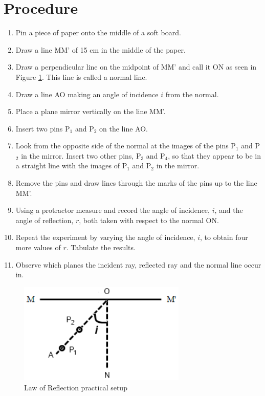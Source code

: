 \section{Procedure}
\begin{enumerate}
\item Pin a piece of paper onto the middle of a soft board.
\item Draw a line MM’ of 15 cm in the middle of the paper.  
\item Draw a perpendicular line on the midpoint of MM’ and call it ON as seen in Figure \ref{fig:law-of-reflection-1}. This line is called a normal line.
\item Draw a line AO making an angle of incidence $i$ from the normal.  
\item Place a plane mirror vertically on the line MM’.
\item Insert two pins P$_1$ and P$_2$ on the line AO.
\item Look from the opposite side of the normal at the images of the pins P$_1$ and P$_2$ in the mirror. Insert two other pins, P$_3$ and P$_4$, so that they appear to be in a straight line with the images of P$_1$ and P$_2$ in the mirror.
\item Remove the pins and draw lines through the marks of the pins up to the line MM’.
\item Using a protractor measure and record the angle of incidence, $i$, and the angle of reflection, $r$, both taken with respect to the normal ON. 
\item Repeat the experiment by varying the angle of incidence, $i$, to obtain four more values of $r$. Tabulate the results.
\item Observe which planes the incident ray, reflected ray and the normal line occur in. 
\end{enumerate}

\begin{figure}[h!]
\centering
\includegraphics[width=8cm]{./img/law-of-reflection-1.png}
\caption{Law of Reflection practical setup}
\label{fig:law-of-reflection-1}
\end{figure}


